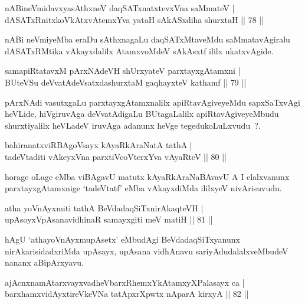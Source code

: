 \begin{shl}
nABineVmidavxyasAthxneV daqSATxnatxtevxVna saMmateV |\\
dASATxRnitxkoVkAtxvAtemxYva yataH sAkASxdiha shurxtaH \hfill || 78 ||
\end{shl}

\begin{artha}
nABi neVmiyeMba eraDu sAthxnagaLu daqSATxMtaveMdu saMmatavAgiralu dASATxRMtika vAkayxdalilx AtamxvoMdeV sAkAsxtf ililx ukatxvAgide.
\end{artha}

\begin{shl}
samapiRtatavxM pArxNAdeVH shUrxyateV parxtayxgAtamxni |\\
BUteVSu deVvatAdeVsatxdashurxtaM gaqhayxteV kathamf \hfill || 79 ||
\end{shl}

\begin{artha}
pArxNAdi vasutxgaLu parxtayxgAtamxnalilx apiRtavAgiveyeMdu sapxSaTxvAgi heVLide, hiVgiruvAga deVvatAdigaLu BUtagaLalilx apiRtavAgiveyeMbudu shurxtiyalilx heVLadeV iruvAga adanunx heVge tegedukoLuLxvudu~?.
\end{artha}

\begin{shl}
bahiranatxviRBAgoV\s sayx kAyaRkAraNatA tathA |\\
tadeVtaditi vAkeyxVna parxtiVcoV\s terxYva vAyaRteV \hfill || 80 ||
\end{shl}

\begin{artha}
horage oLage eMba viBAgavU matutx kAyaRkAraNaBAvavU A I elalxvanunx parxtayxgAtamxnige `tadeVtatf' eMba vAkayxdiMda ililxyeV nivArisuvudu.
\end{artha}

\begin{shl}
atha yoV\s nAyxmiti tathA BeVdadaqSiTxnirAkaqteVH |\\
upAsoyxVpAsanavidhinaR samayxgiti meV matiH \hfill || 81 ||
\end{shl}

\begin{artha}
hAgU `athayoV\s nAyxmupAsetx' eMbudAgi BeVdadaqSiTxyanunx nirAkarisidadxriMda upAsayx, upAsana vidhAnavu sariyAdudalalxveMbudeV nananx aBipArxyavu.
\end{artha}

\begin{shl}
ajAcnxnamAtarxvayxvadheVbarxRhemxYkAtamxyXPalasayx ca |\\
barxhamxvidAyxtireVkeVNa tatApxrXpwtx nAparA kirxyA \hfill || 82 ||
\end{shl}

